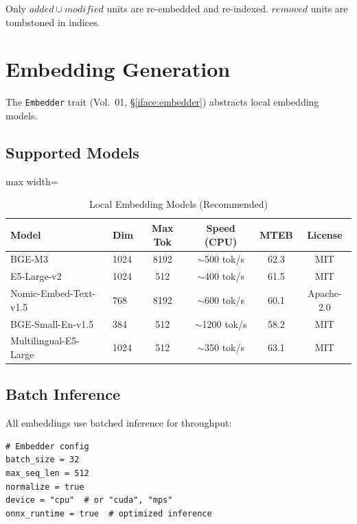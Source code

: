 Only $added \cup modified$ units are re-embedded and re-indexed. $removed$ units are tombstoned in indices.

\section{Embedding Generation}
\label{sec:parsing:embedding}

The \texttt{Embedder} trait (Vol.~01, \S\ref{iface:embedder}) abstracts local embedding models.

\subsection{Supported Models}
\label{sec:parsing:embed-models}

\begin{table}[htbp]
\centering
\caption{Local Embedding Models (Recommended)}
\label{tab:parsing:embed-models}
\begin{adjustbox}{max width=\textwidth}
\begin{tabular}{llcccc}
\toprule
\textbf{Model} & \textbf{Dim} & \textbf{Max Tok} & \textbf{Speed (CPU)} & \textbf{MTEB} & \textbf{License} \\
\midrule
BGE-M3 & 1024 & 8192 & $\sim$500 tok/s & 62.3 & MIT \\
E5-Large-v2 & 1024 & 512 & $\sim$400 tok/s & 61.5 & MIT \\
Nomic-Embed-Text-v1.5 & 768 & 8192 & $\sim$600 tok/s & 60.1 & Apache-2.0 \\
BGE-Small-En-v1.5 & 384 & 512 & $\sim$1200 tok/s & 58.2 & MIT \\
Multilingual-E5-Large & 1024 & 512 & $\sim$350 tok/s & 63.1 & MIT \\
\bottomrule
\end{tabular}
\end{adjustbox}
\end{table}

\subsection{Batch Inference}
\label{sec:parsing:batch-inference}

All embeddings use batched inference for throughput:

\begin{verbatim}
# Embedder config
batch_size = 32
max_seq_len = 512
normalize = true
device = "cpu"  # or "cuda", "mps"
onnx_runtime = true  # optimized inference
\end{verbatim}

